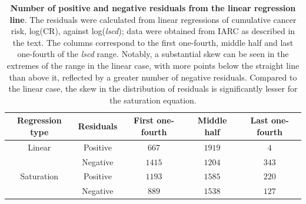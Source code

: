 \documentclass[12pt,onecolumn,twoside]{article}
\begin{document}
		\begin{table}[tbhp]
			\centering
			\caption{\textbf{Number of positive and negative residuals from the linear regression line}. The residuals were calculated from linear regressions of cumulative cancer risk, log(CR), against log(\textit{lscd}); data were obtained from IARC as described in the text. The columns correspond to the first one-fourth, middle half and last one-fourth of the \textit{lscd} range. Notably, a substantial skew can be seen in the extremes of the range in the linear case, with more points below the straight line than above it, reflected by a greater number of negative residuals. Compared to the linear case, the skew in the distribution of residuals is significantly lesser for the saturation equation.}
			\vspace{5pt}
			\begin{tabular}[c]{ccccc}
				\textbf{Regression type} & \textbf{Residuals} & \textbf{First one-fourth} & \textbf{Middle half} & \textbf{Last one-fourth} \\
				\hline
				Linear & Positive & $667$ & $1919$ & $4$ \\
			  	& Negative & $1415$ & $1204$ & $343$ \\
				Saturation & Positive & $1193$ & $1585$ & $220$ \\
			 	& Negative & $889$ & $1538$ & $127$ \\
			 	\hline
			\end{tabular}
			\label{Table S3.2}
		\end{table}

		\printbibliography
\end{document}

